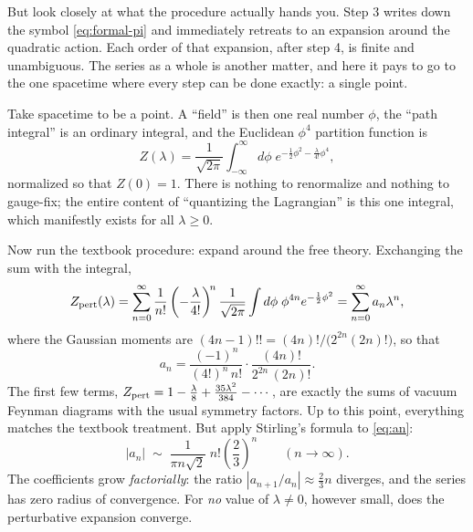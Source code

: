 But look closely at what the procedure actually hands you. Step 3 writes down
the symbol \eqref{eq:formal-pi} and immediately retreats to an expansion around
the quadratic action. Each order of that expansion, after step 4, is finite and
unambiguous. The series as a whole is another matter, and here it pays to go to
the one spacetime where every step can be done exactly: a single point.

\begin{eexample}
\label{ex:zero-d}
Take spacetime to be a point. A ``field'' is then one real number $\phi$, the
``path integral'' is an ordinary integral, and the Euclidean $\phi^4$ partition
function is
\begin{equation}
Z(\lambda) = \frac{1}{\sqrt{2\pi}}\int_{-\infty}^{\infty} d\phi \;
  e^{-\frac{1}{2}\phi^2 - \frac{\lambda}{4!}\phi^4},
\label{eq:zerod-Z}
\end{equation}
normalized so that $Z(0) = 1$. There is nothing to renormalize and nothing to
gauge-fix; the entire content of ``quantizing the Lagrangian'' is this one
integral, which manifestly exists for all $\lambda \ge 0$.

Now run the textbook procedure: expand around the free theory. Exchanging the
sum with the integral,
\begin{equation}
Z_{\rm pert}(\lambda) = \sum_{n=0}^{\infty} \frac{1}{n!}
  \left(-\frac{\lambda}{4!}\right)^{\!n} \frac{1}{\sqrt{2\pi}}\int d\phi\;
  \phi^{4n} e^{-\frac{1}{2}\phi^2}
  = \sum_{n=0}^{\infty} a_n \lambda^n ,
\end{equation}
where the Gaussian moments are $(4n-1)!! = (4n)!/\big(2^{2n}(2n)!\big)$, so that
\begin{equation}
a_n = \frac{(-1)^n}{(4!)^n\, n!} \cdot \frac{(4n)!}{2^{2n}\,(2n)!}.
\label{eq:an}
\end{equation}
The first few terms, $Z_{\rm pert} = 1 - \frac{\lambda}{8} +
\frac{35\lambda^2}{384} - \cdots$, are exactly the sums of vacuum Feynman
diagrams with the usual symmetry factors. Up to this point, everything
matches the textbook treatment. But apply
Stirling's formula to \eqref{eq:an}:
\begin{equation}
|a_n| \;\sim\; \frac{1}{\pi n \sqrt{2}} \; n! \left(\frac{2}{3}\right)^{\!n}
\qquad (n \to \infty).
\label{eq:an-asymptotic}
\end{equation}
The coefficients grow \emph{factorially}: the ratio $|a_{n+1}/a_n| \approx
\tfrac{2}{3}n$ diverges, and the series has zero radius of convergence. For
\emph{no} value of $\lambda \neq 0$, however small, does the perturbative
expansion converge.


\end{eexample}
